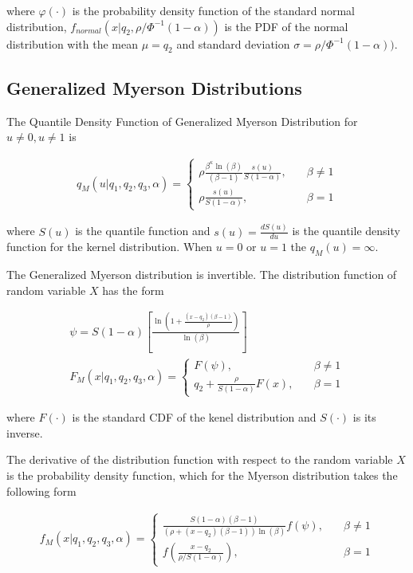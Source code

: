 \documentclass[
  letterpaper,
  DIV=11,
  numbers=noendperiod]{scrartcl}
\begin{document}
where \(\varphi(\cdot)\) is the probability density function of the
standard normal distribution,
\(f_{normal}\left(x\vert q_2,\rho/\Phi^{-1}(1-\alpha)\right)\) is the
PDF of the normal distribution with the mean \(\mu=q_2\) and standard
deviation \(\sigma=\rho/\Phi^{-1}(1-\alpha))\).

\subsection*{Generalized Myerson
Distributions}\label{generalized-myerson-distributions}

The Quantile Density Function of Generalized Myerson Distribution for
\(u\neq0, u\neq1\) is

\[
\begin{gathered}
q_M(u\vert q_1,q_2,q_3,\alpha)=
\begin{cases}
\rho\frac{\beta^\kappa\ln(\beta)}{(\beta-1)}\frac{s(u)}{S(1-\alpha)}, \quad &\beta \neq 1\\
\rho\frac{s(u)}{S(1-\alpha)}, \quad &\beta = 1
\end{cases}
\end{gathered}
\]

where \(S(u)\) is the quantile function and \(s(u)=\frac{dS(u)}{du}\) is
the quantile density function for the kernel distribution. When \(u=0\)
or \(u=1\) the \(q_M(u)=\infty\).

The Generalized Myerson distribution is invertible. The distribution
function of random variable \(X\) has the form

\[
\begin{gathered}
\psi =S(1-\alpha)\left[\frac{\ln\left(1+\frac{(x-q_2)(\beta-1)}{\rho}\right)}{\ln(\beta)}\right]\\
F_M(x\vert q_1, q_2, q_3, \alpha) =
\begin{cases}
F(\psi), \quad &\beta\neq 1\\
q_2+ \frac{\rho}{S(1-\alpha)}F(x), \quad &\beta=1
\end{cases}
\end{gathered}
\]

where \(F(\cdot)\) is the standard CDF of the kenel distribution and
\(S(\cdot)\) is its inverse.

The derivative of the distribution function with respect to the random
variable \(X\) is the probability density function, which for the
Myerson distribution takes the following form

\[
\begin{gathered}
f_M(x\vert q_1, q_2, q_3, \alpha)=
\begin{cases}
\frac{S(1-\alpha)(\beta-1)}{(\rho+(x-q_2)(\beta-1))\ln(\beta)}f(\psi), \quad &\beta\neq1\\
f\left(\frac{x-q_2}{\rho/S(1-\alpha)}\right),\quad &\beta=1
\end{cases}
\end{gathered}
\]
\end{document}
